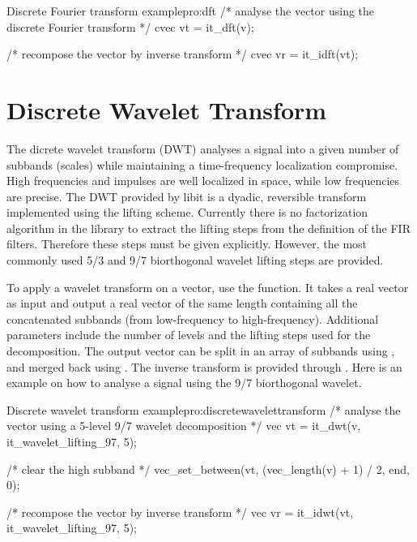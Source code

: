\begin{program}{Discrete Fourier transform example}{pro:dft}
/* analyse the vector using the discrete Fourier transform */
cvec vt = it_dft(v);

/* recompose the vector by inverse transform */
cvec vr = it_idft(vt);
\end{program}

\section{Discrete Wavelet Transform}
\label{sec:discretewaveletransform}

    The dicrete wavelet transform (DWT) analyses a signal into a given
  number of subbands (scales) while maintaining a time-frequency
  localization compromise. High frequencies and impulses are well
  localized in space, while low frequencies are precise. The DWT
  provided by libit is a dyadic, reversible transform implemented
  using the lifting scheme. Currently there is no factorization
  algorithm in the library to extract the lifting steps from the
  definition of the FIR filters. Therefore these steps must be given
  explicitly. However, the most commonly used 5/3 and 9/7 biorthogonal
  wavelet lifting steps are provided.  

    To apply a wavelet transform on a vector, use the
   function. It takes a real
  vector as input and output a real vector of the same length
  containing all the concatenated subbands (from low-frequency to
  high-frequency). Additional parameters include the number of levels
  and the lifting steps used for the decomposition. The output vector
  can be split in an array of subbands using
  , and merged back using 
  . The
  inverse transform is provided through 
  . Here is an example on how to
  analyse a signal using the 9/7 biorthogonal wavelet. 

\begin{program}{Discrete wavelet transform example}{pro:discretewavelettransform}
/* analyse the vector using a 5-level 9/7 wavelet decomposition */
vec vt = it_dwt(v, it_wavelet_lifting_97, 5);

/* clear the high subband */
vec_set_between(vt, (vec_length(v) + 1) / 2, end, 0);

/* recompose the vector by inverse transform */
vec vr = it_idwt(vt, it_wavelet_lifting_97, 5);
\end{program}

